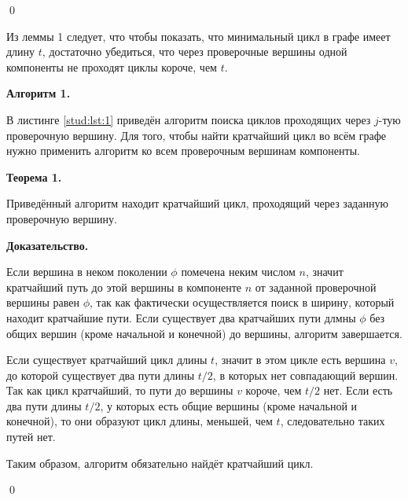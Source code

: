 \documentclass[14pt]{mmcs_article}
\begin{document}
\qed

Из леммы 1 следует, что чтобы показать, что минимальный цикл в графе имеет длину $t$, достаточно убедиться, что через проверочные вершины одной компоненты не проходят циклы короче, чем $t$.

\textbf{Алгоритм 1.} 

В листинге \ref{stud:lst:1} приведён алгоритм поиска циклов проходящих через $j$-тую проверочную вершину. Для того, чтобы найти кратчайший цикл во всём графе нужно применить алгоритм ко всем проверочным вершинам компоненты.

\textbf{Теорема 1.}

Приведённый алгоритм находит кратчайший цикл, проходящий через заданную проверочную вершину.

\textbf{Доказательство.}

Если вершина в неком поколении $\phi$ помечена неким числом $n$, значит кратчайший путь до этой вершины в компоненте $n$ от заданной проверочной вершины равен $\phi$, так как фактически осуществляется поиск в ширину, который находит кратчайшие пути. Если существует два кратчайших пути длмны $\phi$ без общих вершин (кроме начальной и конечной) до вершины, алгоритм завершается.

Если существует кратчайший цикл длины $t$, значит в этом цикле есть вершина $v$, до которой существует два пути длины $t / 2$, в которых нет совпадающий вершин. Так как цикл кратчайший, то пути до вершины $v$ короче, чем $t / 2$ нет. Если есть два пути длины $t / 2$, у которых есть общие вершины (кроме начальной и конечной), то они образуют цикл длины, меньшей, чем $t$, следовательно таких путей нет.

Таким образом, алгоритм обязательно найдёт кратчайший цикл.

\qed
\end{document}
